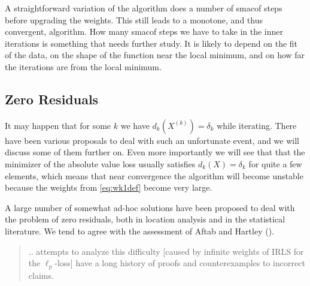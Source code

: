 \documentclass[
  12pt,
  letterpaper,
  DIV=11,
  numbers=noendperiod]{scrartcl}
\theoremstyle{definition}
\theoremstyle{plain}
\theoremstyle{plain}
\theoremstyle{remark}
\begin{document}
A straightforward variation of the algorithm does a number of smacof
steps before upgrading the weights. This still leads to a monotone, and
thus convergent, algorithm. How many smacof steps we have to take in the
inner iterations is something that needs further study. It is likely to
depend on the fit of the data, on the shape of the function near the
local minimum, and on how far the iterations are from the local minimum.

\subsection{Zero Residuals}\label{sec-zero}

It may happen that for some \(k\) we have \(d_k(X^{(k)})=\delta_k\)
while iterating. There have been various proposals to deal with such an
unfortunate event, and we will discuss some of them further on. Even
more importantly we will see that that the minimizer of the absolute
value loss usually satisfies \(d_k(X)=\delta_k\) for quite a few
elements, which means that near convergence the algorithm will become
unstable because the weights from \eqref{eq:wk1def} become very large.

A large number of somewhat ad-hoc solutions have been proposed to deal
with the problem of zero residuals, both in location analysis and in the
statistical literature. We tend to agree with the assessment of Aftab
and Hartley ().

\begin{quote}
.. attempts to analyze this difficulty {[}caused by infinite weights of
IRLS for the \(\ell_p\)-loss{]} have a long history of proofs and
counterexamples to incorrect claims.
\end{quote}
\end{document}
